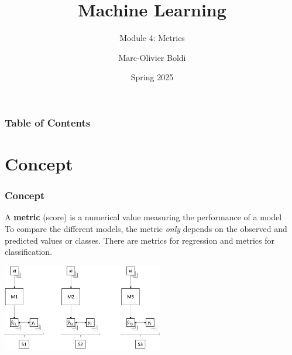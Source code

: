 
\title{Machine Learning}
\subtitle{Module 4: Metrics}
\author[MOB]{Marc-Olivier Boldi}
\date{Spring 2025}

\begin{frame}
  \titlepage
\end{frame}
\begin{frame}
\frametitle{Table of Contents}
	\tableofcontents
\end{frame}
\section{Concept}
\begin{frame}
\frametitle{Concept}
A {\bf metric} (score) is a numerical value measuring the performance of a model\\ 
\vspace{0.2cm}
To compare the different models, the metric {\it only} depends on the observed and predicted values or classes. There are metrics for regression and metrics for classification.
\begin{center}
\includegraphics[width=7cm]{../Graphs/ML3.png}
\end{center}
\end{frame}
